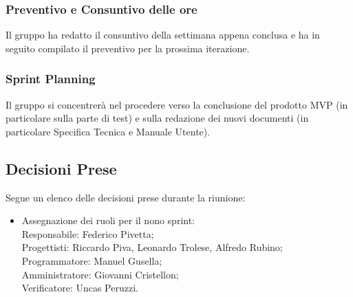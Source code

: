 \documentclass[10pt]{article}
\begin{document}
\subsubsection{Preventivo e Consuntivo delle ore}
Il gruppo ha redatto il consuntivo della settimana appena conclusa e ha in seguito compilato il preventivo per la prossima iterazione.

\subsubsection{Sprint Planning}
Il gruppo si concentrerà nel procedere verso la conclusione del prodotto MVP (in particolare sulla parte di test) e sulla redazione dei nuovi documenti (in particolare Specifica Tecnica e Manuale Utente).

\subsection{Decisioni Prese}
Segue un elenco delle decisioni prese durante la riunione:
\begin{itemize}
    \item   Assegnazione dei ruoli per il nono sprint:\\
            Responsabile: Federico Pivetta;\\
            Progettisti: Riccardo Piva, Leonardo Trolese, Alfredo Rubino;\\
            Programmatore: Manuel Gusella;\\
            Amministratore: Giovanni Cristellon;\\
            Verificatore: Uncas Peruzzi.
\end{itemize}
\end{document}
